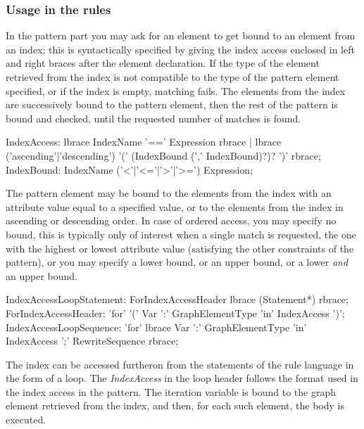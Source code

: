 \subsubsection*{Usage in the rules}\label{sub:indexusage}

In the pattern part you may ask for an element to get bound to an element from an index;
this is syntactically specified by giving the index access enclosed in left and right braces after the element declaration.
If the type of the element retrieved from the index is not compatible to the type of the pattern element specified,
or if the index is empty, matching fails.
The elements from the index are successively bound to the pattern element, then the rest of the pattern is bound and checked, until the requested number of matches is found.

\begin{rail}
  IndexAccess:
    lbrace IndexName '==' Expression rbrace |
		lbrace ('ascending'|'descending') '(' (IndexBound (',' IndexBound)?)? ')' rbrace;
	IndexBound: IndexName ('<'|'<='|'>'|'>=') Expression;
\end{rail}

The pattern element may be bound to the elements from the index with an attribute value equal to a specified value,
or to the elements from the index in ascending or descending order.
In case of ordered access, you may specify no bound, this is typically only of interest when a single match is requested, the one with the highest or lowest attribute value (satisfying the other constraints of the pattern), or you may specify a lower bound, or an upper bound, or a lower \emph{and} an upper bound.

\begin{rail}
  IndexAccessLoopStatement:
    ForIndexAccessHeader lbrace (Statement*) rbrace;
  ForIndexAccessHeader:
    'for' '(' Var ':' GraphElementType 'in' IndexAccess ')';
  IndexAccessLoopSequence:
    'for' lbrace Var ':' GraphElementType 'in' IndexAccess ';' RewriteSequence rbrace;
\end{rail}

The index can be accessed furtheron from the statements of the rule language in the form of a loop.
The \emph{IndexAccess} in the loop header follows the format used in the index access in the pattern.
The iteration variable is bound to the graph element retrieved from the index, and then, for each such element, the body is executed.

